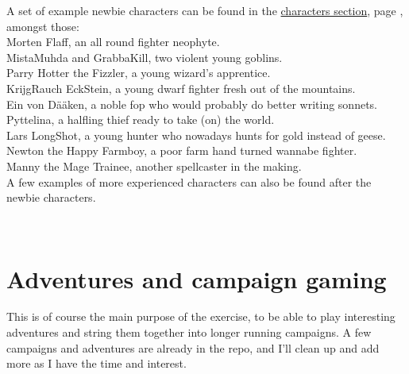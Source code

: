 A set of example newbie characters can be found in the
\hyperref[cpt:characters]{characters section},
page \pageref{cpt:characters},
amongst those: \\
Morten Flaff, an all round fighter neophyte. \\
MistaMuhda and GrabbaKill, two violent young goblins. \\
Parry Hotter the Fizzler, a young wizard's apprentice. \\
KrijgRauch EckStein, a young dwarf fighter fresh out of the mountains. \\
Ein von Dääken, a noble fop who would probably do better writing sonnets. \\
Pyttelina, a halfling thief ready to take (on) the world. \\
Lars LongShot, a young hunter who nowadays hunts for gold instead of geese. \\
Newton the Happy Farmboy, a poor farm hand turned wannabe fighter. \\
Manny the Mage Trainee, another spellcaster in the making. \\
A few examples of more experienced characters can also be found after the newbie characters.

\














\flushbottom %

\section*{Adventures and campaign gaming}
This is of course the main purpose of the exercise, to be able to play interesting adventures and string them together into longer running campaigns.
A few campaigns and adventures are already in the repo, and I'll clean up and add more as I have the time and interest.

